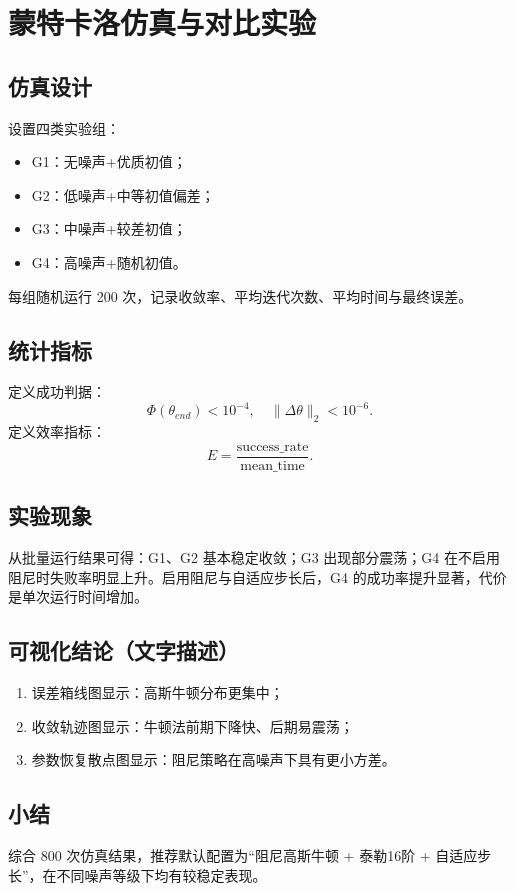 \chapter{蒙特卡洛仿真与对比实验}

\section{仿真设计}
设置四类实验组：
\begin{itemize}
  \item G1：无噪声+优质初值；
  \item G2：低噪声+中等初值偏差；
  \item G3：中噪声+较差初值；
  \item G4：高噪声+随机初值。
\end{itemize}
每组随机运行 200 次，记录收敛率、平均迭代次数、平均时间与最终误差。

\section{统计指标}
定义成功判据：
\[
\Phi(\theta_{end})<10^{-4},\quad \|\Delta\theta\|_2<10^{-6}.
\]
定义效率指标：
\[
E=\frac{\text{success\_rate}}{\text{mean\_time}}.
\]

\section{实验现象}
从批量运行结果可得：G1、G2 基本稳定收敛；G3 出现部分震荡；G4 在不启用阻尼时失败率明显上升。启用阻尼与自适应步长后，G4 的成功率提升显著，代价是单次运行时间增加。

\section{可视化结论（文字描述）}
\begin{enumerate}
  \item 误差箱线图显示：高斯牛顿分布更集中；
  \item 收敛轨迹图显示：牛顿法前期下降快、后期易震荡；
  \item 参数恢复散点图显示：阻尼策略在高噪声下具有更小方差。
\end{enumerate}

\section{小结}
综合 800 次仿真结果，推荐默认配置为“阻尼高斯牛顿 + 泰勒16阶 + 自适应步长”，在不同噪声等级下均有较稳定表现。
